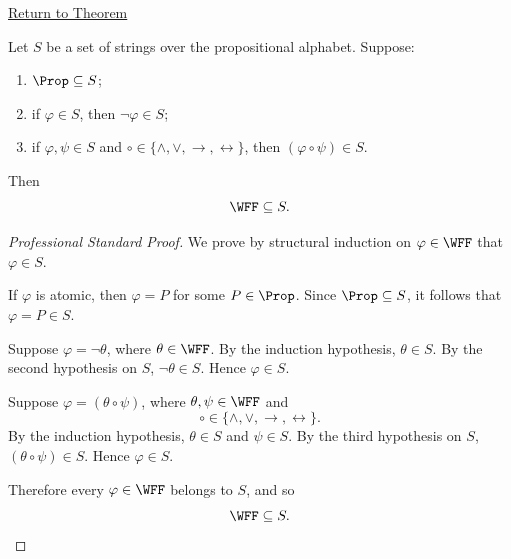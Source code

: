 \newpage
{}
\label{prf:minimality-of-well-formed-formulas}

\begin{remark*}[Return]
\hyperref[thm:minimality-of-well-formed-formulas]{Return to Theorem}
\end{remark*}

\begin{theorem*}
Let \(S\) be a set of strings over the propositional alphabet. Suppose:
\begin{enumerate}
  \item \(\Prop\subseteq S\);
  \item if \(\varphi\in S\), then \(\neg\varphi\in S\);
  \item if \(\varphi,\psi\in S\) and
        \(\circ\in\{\land,\lor,\to,\leftrightarrow\}\), then
        \((\varphi\circ\psi)\in S\).
\end{enumerate}
Then
\[
\WFF\subseteq S.
\]
\end{theorem*}

\begin{proof}[Professional Standard Proof]
\LRAProofBodyStart
We prove by structural induction on \(\varphi\in\WFF\) that
\(\varphi\in S\).

If \(\varphi\) is atomic, then \(\varphi=P\) for some
\(P\in\Prop\). Since \(\Prop\subseteq S\), it follows that
\(\varphi=P\in S\).

Suppose \(\varphi=\neg\theta\), where \(\theta\in\WFF\). By the induction
hypothesis, \(\theta\in S\). By the second hypothesis on \(S\),
\(\neg\theta\in S\). Hence \(\varphi\in S\).

Suppose \(\varphi=(\theta\circ\psi)\), where
\(\theta,\psi\in\WFF\) and
\[
\circ\in\{\land,\lor,\to,\leftrightarrow\}.
\]
By the induction hypothesis, \(\theta\in S\) and \(\psi\in S\). By the
third hypothesis on \(S\), \((\theta\circ\psi)\in S\). Hence
\(\varphi\in S\).

Therefore every \(\varphi\in\WFF\) belongs to \(S\), and so
\[
\WFF\subseteq S.
\]
\end{proof}

